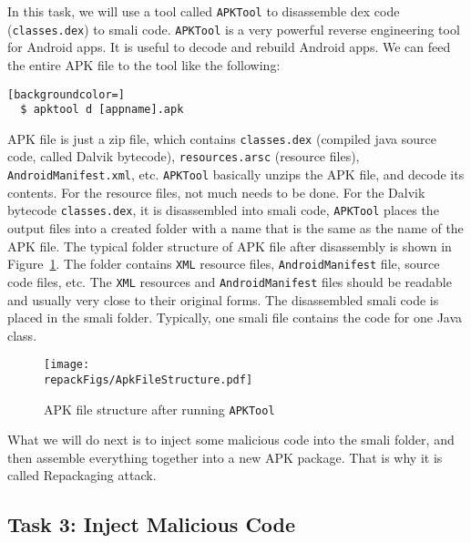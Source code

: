 In this task, we will use a tool called \texttt{APKTool} to disassemble dex 
code (\texttt{classes.dex})
to smali code. \texttt{APKTool} is a very powerful reverse engineering tool for Android apps. It
is useful to decode and rebuild Android apps. 
We can feed the entire APK file to the tool like the following:

\begin{lstlisting}[backgroundcolor=]
  $ apktool d [appname].apk 
\end{lstlisting}


APK file is just a zip file, which contains \texttt{classes.dex} (compiled java source code,
called Dalvik bytecode), \texttt{resources.arsc} (resource files), 
\texttt{AndroidManifest.xml}, etc. \texttt{APKTool} basically unzips the APK file, and decode its contents. 
For the resource files, not much needs to be done. 
For the Dalvik bytecode \texttt{classes.dex}, it is disassembled into smali code, 
\texttt{APKTool} places the output files
into a created folder with a name that is the same as the
name of the APK file. The typical folder structure of APK file after
disassembly is shown in Figure~\ref{fig:repackaging:apkfilestructure}.
The folder contains \texttt{XML} resource files, 
\texttt{AndroidManifest} file, source code
files, etc. The \texttt{XML} resources and 
\texttt{AndroidManifest} files should be readable and usually very
close to their original forms. The disassembled smali code is placed in the 
smali folder. Typically, one smali file contains the code for one Java class.



\begin{figure}[htb]
  \begin{center}
    \texttt{[image: \\repackFigs/ApkFileStructure.pdf]}
  \end{center}
  \caption{APK file structure after running \texttt{APKTool}}
  \label{fig:repackaging:apkfilestructure}
\end{figure}
 

What we will do next is to inject some malicious code into the smali folder,
and then assemble everything together into a new APK package. That is why it is
called Repackaging attack. 



\subsection{Task 3: Inject Malicious Code}

